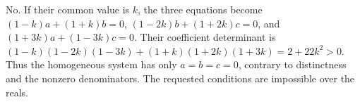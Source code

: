 No. If their common value is $k$, the three equations become $(1-k)a+(1+k)b=0$, $(1-2k)b+(1+2k)c=0$, and $(1+3k)a+(1-3k)c=0$. Their coefficient determinant is $(1-k)(1-2k)(1-3k)+(1+k)(1+2k)(1+3k)=2+22k^2>0$. Thus the homogeneous system has only $a=b=c=0$, contrary to distinctness and the nonzero denominators. The requested conditions are impossible over the reals.
